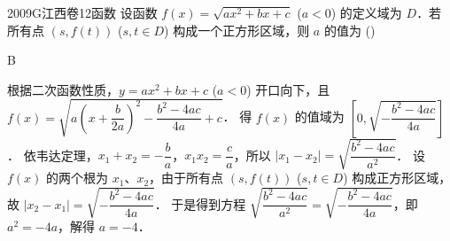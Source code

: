 
\begin{problem}{2009}{G}{江西卷}{12}{函数}
设函数 $ f(x)=\sqrt{ax^2+bx+c} $ ($ a<0 $) 的定义域为 $ D $．若所有点 $ (s,f(t)) $ ($ s,t\in D $) 构成一个正方形区域，则 $ a $ 的值为 (\hspace{1cm})
\begin{choices}
\end{choices}
\end{problem}

\begin{answer}
B
\end{answer}

\begin{solutions}
根据二次函数性质，$ y=ax^2+bx+c $ ($ a<0 $) 开口向下，且 $ f(x)=\sqrt{a\left(x+\dfrac{b}{2a}\right)^2-\dfrac{b^2-4ac}{4a}+c} $．  
得 $ f(x) $ 的值域为 $ \left[0,\sqrt{-\dfrac{b^2-4ac}{4a}}\right] $．  
依韦达定理，$ x_1+x_2=-\dfrac{b}{a} $，$ x_1x_2=\dfrac{c}{a} $，所以 $ |x_1-x_2|=\sqrt{\dfrac{b^2-4ac}{a^2}} $．  
设 $ f(x) $ 的两个根为 $ x_1 $、$ x_2 $，由于所有点 $ (s,f(t)) $ ($ s,t\in D $) 构成正方形区域，故 $ |x_2-x_1|=\sqrt{-\dfrac{b^2-4ac}{4a}} $．  
于是得到方程 $ \sqrt{\dfrac{b^2-4ac}{a^2}}=\sqrt{-\dfrac{b^2-4ac}{4a}} $，即 $ a^2=-4a $，解得 $ a=-4 $．
\end{solutions}